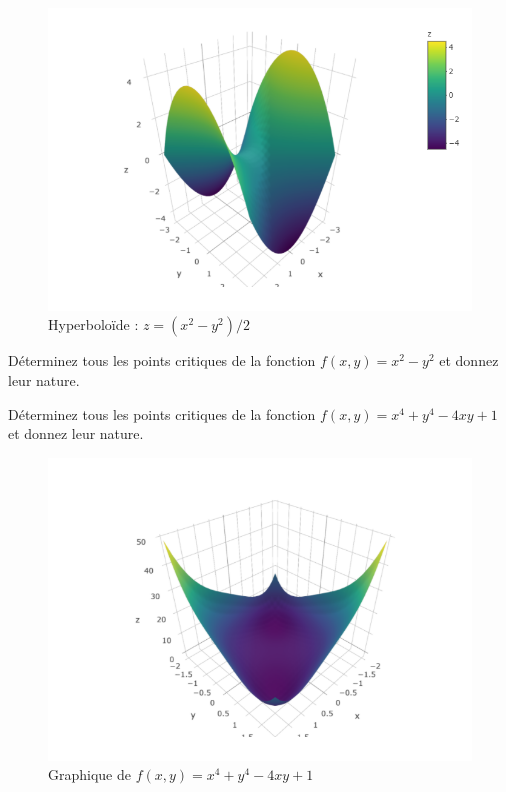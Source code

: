 \documentclass[]{book}
\theoremstyle{definition}
\theoremstyle{definition}
\theoremstyle{definition}
\theoremstyle{remark}
\let\BeginKnitrBlock\begin \let\EndKnitrBlock\end
\begin{document}
\begin{figure}

{\centering \includegraphics[width=0.8\linewidth]{resources/images/hyperboloide} 

}

\caption{Hyperboloïde : $z=(x^2-y^2)/2$}\label{fig:hyperboloide1}
\end{figure}

\BeginKnitrBlock{example}
\protect\hypertarget{exm:unnamed-chunk-214}{}{\label{exm:unnamed-chunk-214}
}Déterminez tous les points critiques de la fonction \(f(x,y)=x^2-y^2\)
et donnez leur nature.
\EndKnitrBlock{example}
\vspace*{8cm}

\BeginKnitrBlock{example}
\protect\hypertarget{exm:unnamed-chunk-215}{}{\label{exm:unnamed-chunk-215}
}Déterminez tous les points critiques de la fonction
\(f(x,y)=x^4+y^4-4xy+1\) et donnez leur nature.
\EndKnitrBlock{example}
\begin{figure}

{\centering \includegraphics[width=0.8\linewidth]{resources/images/fct_pt_critique} 

}

\caption{Graphique de $f(x,y)=x^4+y^4-4xy+1$}\label{fig:fct-pt-critique}
\end{figure}
\vspace*{8cm}
\end{document}
